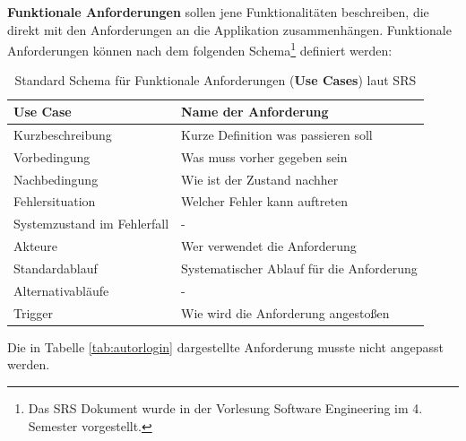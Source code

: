 	\textbf{Funktionale Anforderungen }sollen jene Funktionalitäten beschreiben, die direkt mit den Anforderungen an die Applikation zusammenhängen. Funktionale Anforderungen können nach dem folgenden Schema\footnote{Das SRS Dokument wurde in der Vorlesung Software Engineering im 4. Semester vorgestellt.} definiert werden:

	\begin{table}[h]
		\centering
		\begin{tabular}{ll}
			Use Case                    &  Name der Anforderung\\ \hline
			Kurzbeschreibung            &  Kurze Definition was passieren soll\\ \hline
			Vorbedingung                &  Was muss vorher gegeben sein\\ \hline
			Nachbedingung               &  Wie ist der Zustand nachher\\ \hline
			Fehlersituation             &  Welcher Fehler kann auftreten\\ \hline
			Systemzustand im Fehlerfall &  - \\ \hline
			Akteure                     &  Wer verwendet die Anforderung\\ \hline
			Standardablauf              &  Systematischer Ablauf für die Anforderung\\ \hline
			Alternativabläufe           &  - \\ \hline
			Trigger                     &  Wie wird die Anforderung angestoßen
		\end{tabular}
		\caption{Standard Schema für Funktionale Anforderungen (\textbf{Use Cases}) laut SRS}
		\label{my-label}
	\end{table}

	\newpage
	Die in Tabelle \ref{tab:autorlogin} dargestellte Anforderung musste nicht angepasst werden.


